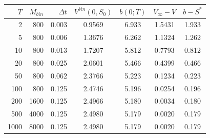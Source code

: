 \begin{tabular}{rrrcccc}
\toprule
$T$ & $M_{bin}$ & $\Delta t$ & $V^{bin}(0,S_0)$ & $b(0;T)$ & $V_\infty-V$ & $b-S^*$ \\
\midrule
2 & 800 & 0.003 & 0.9569 & 6.933 & 1.5431 & 1.933 \\
5 & 800 & 0.006 & 1.3676 & 6.262 & 1.1324 & 1.262 \\
10 & 800 & 0.013 & 1.7207 & 5.812 & 0.7793 & 0.812 \\
20 & 800 & 0.025 & 2.0601 & 5.466 & 0.4399 & 0.466 \\
50 & 800 & 0.062 & 2.3766 & 5.223 & 0.1234 & 0.223 \\
100 & 800 & 0.125 & 2.4746 & 5.196 & 0.0254 & 0.196 \\
200 & 1600 & 0.125 & 2.4966 & 5.180 & 0.0034 & 0.180 \\
500 & 4000 & 0.125 & 2.4980 & 5.179 & 0.0020 & 0.179 \\
1000 & 8000 & 0.125 & 2.4980 & 5.179 & 0.0020 & 0.179 \\
\bottomrule
\end{tabular}
